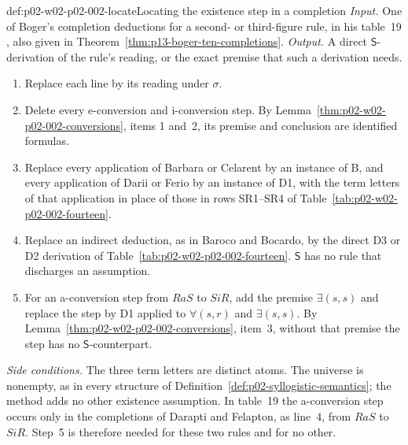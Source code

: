 \begin{hbmethod}{def:p02-w02-p02-002-locate}{Locating the existence step in a completion}
\emph{Input.} One of Boger's completion deductions for a second- or
third-figure rule, in his table~19
\cite[p.~187]{Boger2004UnderlyingLogic}, also given in
Theorem~\ref{thm:p13-boger-ten-completions}.
\emph{Output.} A direct \(\mathsf S\)-derivation of the rule's reading, or
the exact premise that such a derivation needs.
\begin{enumerate}
\item Replace each line by its reading under \(\sigma\).
\item Delete every e-conversion and i-conversion step. By
 Lemma~\ref{thm:p02-w02-p02-002-conversions}, items 1 and~2, its premise and
 conclusion are identified formulas.
\item Replace every application of Barbara or Celarent by an instance of
 B, and every application of Darii or Ferio by an instance of D1, with the
 term letters of that application in place of those in rows SR1--SR4 of
 Table~\ref{tab:p02-w02-p02-002-fourteen}.
\item Replace an indirect deduction, as in Baroco and Bocardo, by the
 direct D3 or D2 derivation of Table~\ref{tab:p02-w02-p02-002-fourteen}.
 \(\mathsf S\) has no rule that discharges an assumption.
\item For an a-conversion step from \(RaS\) to \(SiR\), add the premise
 \(\exists(s,s)\) and replace the step by D1 applied to \(\forall(s,r)\)
 and \(\exists(s,s)\). By Lemma~\ref{thm:p02-w02-p02-002-conversions},
 item~3, without that premise the step has no \(\mathsf S\)-counterpart.
\end{enumerate}
\emph{Side conditions.} The three term letters are distinct atoms. The
universe is nonempty, as in every structure of
Definition~\ref{def:p02-syllogistic-semantics}; the method adds no other
existence assumption. In table~19 the a-conversion step occurs only in the
completions of Darapti and Felapton, as line~4, from \(RaS\) to \(SiR\).
Step~5 is therefore needed for these two rules and for no other.
\end{hbmethod}

